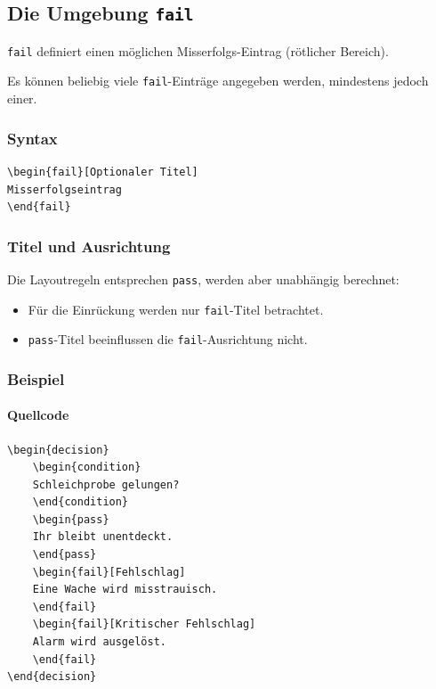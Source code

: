 \subsection{Die Umgebung \texttt{fail}}

\verb|fail| definiert einen möglichen Misserfolgs-Eintrag
(rötlicher Bereich).

Es können beliebig viele \verb|fail|-Einträge angegeben werden,
mindestens jedoch einer.

\subsubsection*{Syntax}

\begin{Verbatim}
\begin{fail}[Optionaler Titel]
Misserfolgseintrag
\end{fail}
\end{Verbatim}

\subsubsection*{Titel und Ausrichtung}

Die Layoutregeln entsprechen \verb|pass|, werden aber unabhängig berechnet:

\begin{itemize}
\item Für die Einrückung werden nur \verb|fail|-Titel betrachtet.
\item \verb|pass|-Titel beeinflussen die \verb|fail|-Ausrichtung nicht.
\end{itemize}

\subsubsection*{Beispiel}

\paragraph{Quellcode}

\begin{Verbatim}
\begin{decision}
    \begin{condition}
    Schleichprobe gelungen?
    \end{condition}
    \begin{pass}
    Ihr bleibt unentdeckt.
    \end{pass}
    \begin{fail}[Fehlschlag]
    Eine Wache wird misstrauisch.
    \end{fail}
    \begin{fail}[Kritischer Fehlschlag]
    Alarm wird ausgelöst.
    \end{fail}
\end{decision}
\end{Verbatim}


